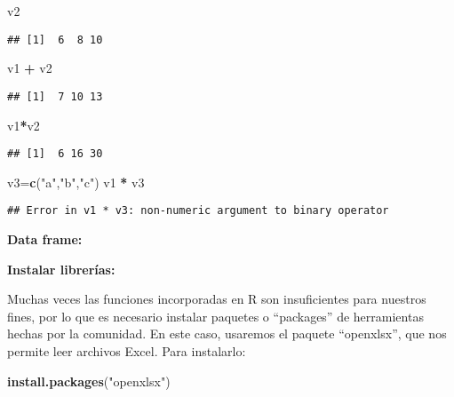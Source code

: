 \documentclass[
]{book}
\newenvironment{Shaded}{\begin{snugshade}}{\end{snugshade}}
\newcommand{\FunctionTok}[1]{\textcolor[rgb]{0.13,0.29,0.53}{\textbf{#1}}}
\newcommand{\NormalTok}[1]{#1}
\newcommand{\OtherTok}[1]{\textcolor[rgb]{0.56,0.35,0.01}{#1}}
\newcommand{\SpecialCharTok}[1]{\textcolor[rgb]{0.81,0.36,0.00}{\textbf{#1}}}
\newcommand{\StringTok}[1]{\textcolor[rgb]{0.31,0.60,0.02}{#1}}
\begin{document}
\begin{Shaded}
\begin{Highlighting}[]
\NormalTok{v2}
\end{Highlighting}
\end{Shaded}

\begin{verbatim}
## [1]  6  8 10
\end{verbatim}

\begin{Shaded}
\begin{Highlighting}[]
\NormalTok{v1 }\SpecialCharTok{+}\NormalTok{ v2}
\end{Highlighting}
\end{Shaded}

\begin{verbatim}
## [1]  7 10 13
\end{verbatim}

\begin{Shaded}
\begin{Highlighting}[]
\NormalTok{v1}\SpecialCharTok{*}\NormalTok{v2}
\end{Highlighting}
\end{Shaded}

\begin{verbatim}
## [1]  6 16 30
\end{verbatim}

\begin{Shaded}
\begin{Highlighting}[]
\NormalTok{v3}\OtherTok{=}\FunctionTok{c}\NormalTok{(}\StringTok{"a"}\NormalTok{,}\StringTok{"b"}\NormalTok{,}\StringTok{"c"}\NormalTok{)}
\NormalTok{v1 }\SpecialCharTok{*}\NormalTok{ v3}
\end{Highlighting}
\end{Shaded}

\begin{verbatim}
## Error in v1 * v3: non-numeric argument to binary operator
\end{verbatim}

\textbf{Data frame:}

\textbf{Instalar librerías:}

Muchas veces las funciones incorporadas en R son insuficientes para
nuestros fines, por lo que es necesario instalar paquetes o ``packages''
de herramientas hechas por la comunidad. En este caso, usaremos el
paquete ``openxlsx'', que nos permite leer archivos Excel. Para
instalarlo:

\begin{Shaded}
\begin{Highlighting}[]
\FunctionTok{install.packages}\NormalTok{(}\StringTok{"openxlsx"}\NormalTok{)}
\end{Highlighting}
\end{Shaded}
\end{document}
